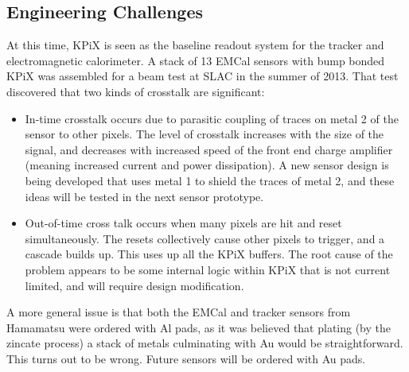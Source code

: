 \subsection{Engineering Challenges}
At this time, KPiX is seen as the baseline readout system for the tracker and electromagnetic calorimeter. A stack of 13 EMCal sensors with bump bonded KPiX was assembled for a beam test at SLAC in the summer of 2013. That test discovered that two kinds of crosstalk are significant:
\begin{itemize}
	\item In-time crosstalk occurs due to parasitic coupling of traces on metal 2 of the sensor to other pixels. The level of crosstalk increases with the size of the signal, and decreases with increased speed of the front end charge amplifier (meaning increased current and power dissipation).  A new sensor design is being developed that uses metal 1 to shield the traces of metal 2, and these ideas will be tested in the next sensor prototype.
	\item Out-of-time cross talk occurs when many pixels are hit and reset simultaneously. The resets collectively cause other pixels to trigger, and a cascade builds up. This uses up all the KPiX buffers. The root cause of the problem appears to be some internal logic within KPiX that is not current limited, and will require design modification.
\end{itemize}
A more general issue is that both the EMCal and tracker sensors from Hamamatsu were ordered with Al pads, as it was believed that plating (by the zincate process) a stack of metals culminating with Au would be straightforward. This turns out to be wrong. %
Future sensors will be ordered with Au pads.

